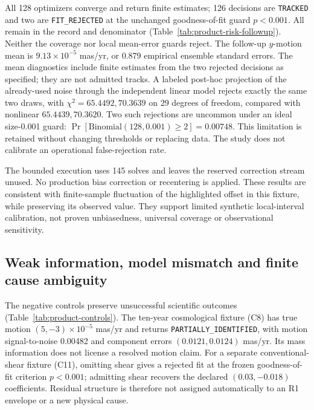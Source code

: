 All 128 optimizers converge and return finite estimates; 126 decisions
are \texttt{TRACKED} and two are \texttt{FIT\_REJECTED} at the unchanged
goodness-of-fit guard $p<0.001$. All remain in the record and denominator
(Table~\ref{tab:product-risk-followup}). Neither the coverage nor local
mean-error guards reject. The follow-up $y$-motion mean is
$9.13\times10^{-5}$ mas/yr, or $0.879$ empirical ensemble standard errors.
The mean diagnostics include finite estimates from the two rejected
decisions as specified; they are not admitted tracks. A labeled post-hoc
projection of the already-used noise through the independent linear
model rejects exactly the same two draws, with $\chi^2=65.4492,70.3639$
on 29 degrees of freedom, compared with nonlinear $65.4439,70.3620$.
Two such rejections are uncommon under an ideal size-0.001 guard:
$\Pr[\mathrm{Binomial}(128,0.001)\geq2]=0.00748$. This limitation is
retained without changing thresholds or replacing data. The study does
not calibrate an operational false-rejection rate.

The bounded execution uses 145 solves and leaves the reserved correction
stream unused. No production bias correction or recentering is applied.
These results are consistent with finite-sample fluctuation of the
highlighted offset in this fixture, while preserving its observed value.
They support limited synthetic local-interval calibration, not proven
unbiasedness, universal coverage or observational sensitivity.

\subsection{Weak information, model mismatch and finite cause ambiguity}
The negative controls preserve unsuccessful scientific outcomes
(Table~\ref{tab:product-controls}). The ten-year cosmological fixture
(C8) has true motion $(5,-3)\times10^{-5}$ mas/yr and returns
\texttt{PARTIALLY\_IDENTIFIED}, with motion signal-to-noise 0.00482 and
component errors $(0.0121,0.0124)$ mas/yr. Its mass information does not
license a resolved motion claim. For a separate conventional-shear
fixture (C11), omitting shear gives a rejected fit at the frozen
goodness-of-fit criterion $p<0.001$; admitting shear recovers the declared
$(0.03,-0.018)$ coefficients. Residual structure is therefore not assigned
automatically to an R1 envelope or a new physical cause.

